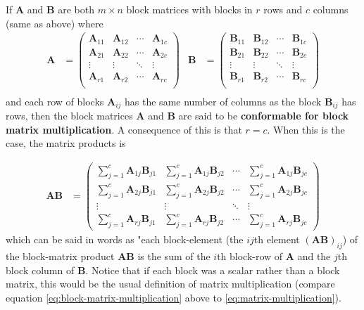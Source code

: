 \documentclass[
]{book}
\theoremstyle{definition}
\theoremstyle{definition}
\theoremstyle{definition}
\theoremstyle{remark}
\begin{document}
If \(\mathbf{A}\) and \(\mathbf{B}\) are both \(m \times n\) block matrices with blocks in \(r\) rows and \(c\) columns (same as above) where
\[
\begin{aligned}
\mathbf{A} & =
\begin{pmatrix} \mathbf{A}_{11} & \mathbf{A}_{12} & \cdots & \mathbf{A}_{1c}\\
\mathbf{A}_{21} & \mathbf{A}_{22} &\cdots & \mathbf{A}_{2c} \\
\vdots & \vdots & \ddots & \vdots \\
\mathbf{A}_{r1} & \mathbf{A}_{r2} &\cdots & \mathbf{A}_{rc} \\
\end{pmatrix} &
\mathbf{B} & =
\begin{pmatrix} \mathbf{B}_{11} & \mathbf{B}_{12} & \cdots & \mathbf{B}_{1c}\\
\mathbf{B}_{21} & \mathbf{B}_{22} &\cdots & \mathbf{B}_{2c} \\
\vdots & \vdots & \ddots & \vdots \\
\mathbf{B}_{r1} & \mathbf{B}_{r2} &\cdots & \mathbf{B}_{rc} \\
\end{pmatrix} \\
\end{aligned}
\]
and each row of blocks \(\mathbf{A}_{ij}\) has the same number of columns as the block \(\mathbf{B}_{ij}\) has rows, then the block matrices \(\mathbf{A}\) and \(\mathbf{B}\) are said to be \textbf{conformable for block matrix multiplication}. A consequence of this is that \(r = c\). When this is the case, the matrix products is

\[
\begin{aligned}
\mathbf{A} \mathbf{B} & =
\begin{pmatrix} \sum_{j = 1}^c \mathbf{A}_{1j} \mathbf{B}_{j1} &  \sum_{j = 1}^c \mathbf{A}_{1j} \mathbf{B}_{j2} & \cdots &  \sum_{j = 1}^c \mathbf{A}_{1j} \mathbf{B}_{jc} \\
\sum_{j = 1}^c \mathbf{A}_{2j} \mathbf{B}_{j1} &  \sum_{j = 1}^c \mathbf{A}_{2j} \mathbf{B}_{j2} & \cdots &  \sum_{j = 1}^c \mathbf{A}_{2j} \mathbf{B}_{jc} \\
\vdots & \vdots & \ddots & \vdots \\
\sum_{j = 1}^c \mathbf{A}_{rj} \mathbf{B}_{j1} &  \sum_{j = 1}^c \mathbf{A}_{rj} \mathbf{B}_{j2} & \cdots &  \sum_{j = 1}^c \mathbf{A}_{rj} \mathbf{B}_{jc} 
\end{pmatrix}  
\end{aligned}
\label{eq:column-row-matrix-multiplication}
\]
which can be said in words as "each block-element (the \(ij\)th element \((\mathbf{A} \mathbf{B})_{ij}\)) of the block-matrix product \(\mathbf{A} \mathbf{B}\) is the sum of the \(i\)th block-row of \(\mathbf{A}\) and the \(j\)th block column of \(\mathbf{B}\). Notice that if each block was a scalar rather than a block matrix, this would be the usual definition of matrix multiplication (compare equation \eqref{eq:block-matrix-multiplication} above to \eqref{eq:matrix-multiplication}).
\end{document}
